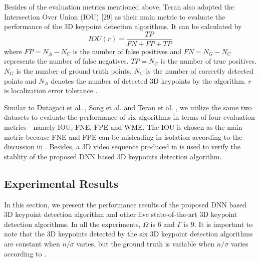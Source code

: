 \documentclass[runningheads]{article}
\begin{document}
Besides of the evaluation metrics mentioned above, Teran \cite{randomforest20143d} also adopted the Intersection Over Union (IOU) [29] as their main metric to evaluate the performance of the 3D keypoint detection algorithms. It can be calculated by
\begin{equation}
	IOU(r) = \frac{TP}{FN+FP+TP}
\end{equation}
where \emph{$FP = N_A-N_C$} is the number of false positives and \emph{$FN = N_G-N_C$} represents the number of false negatives. \emph{$TP = N_C$} is the number of true positives. \emph{$N_G$} is the number of ground truth points, \emph{$N_C$} is the number of correctly detected points and \emph{$N_A$} denotes the number of detected 3D keypoints by the algorithm. \emph{$r$} is localization error tolerance \cite{dutagaci2012evaluation}.

Similar to Dutagaci et al. \cite{dutagaci2012evaluation}, Song et al. \cite{song20133d} and Teran et al. \cite{randomforest20143d}, we utilize the same two datasets to evaluate the performance of six algorithms in terms of four evaluation metrics - namely IOU, FNE, FPE and WME. The IOU is chosen as the main metric because FNE and FPE can be misleading in isolation according to the discussion in \cite{randomforest20143d}. Besides, a 3D video sequence produced in \cite{3Dsequence} is used to verify the stablity of the proposed DNN based 3D keypoints detection algorithm.

\subsection{Experimental Results}
In this section, we present the performance results of the proposed DNN based 3D keypoint detection algorithm and other five state-of-the-art 3D keypoint detection algorithms. In all the experiments, \emph{$\Omega$} is 6 and \emph{$\Gamma$} is 9. It is important to note that the 3D keypoints detected by the six 3D keypoint detection algorithms are constant when \emph{$n/\sigma$} varies, but the ground truth is variable when \emph{$n/\sigma$} varies according to \cite{dutagaci2012evaluation}. 
\end{document}
